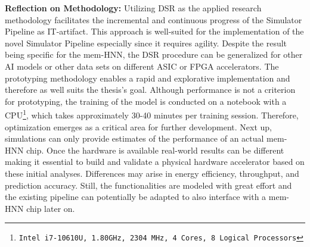 \textbf{Reflection on Methodology:} 
Utilizing \ac{DSR} as the applied research methodology facilitates the incremental and continuous progress of the Simulator Pipeline as \ac{IT}-artifact.
This approach is well-suited for the implementation of the novel Simulator Pipeline especially since it requires agility.
Despite the result being specific for the \ac{mem-HNN}, the \ac{DSR} procedure can be generalized for other AI models or other data sets on different \ac{ASIC} or \ac{FPGA} accelerators. 
The prototyping methodology enables a rapid and explorative implementation and therefore as well suits the thesis's goal. 
Although performance is not a criterion for prototyping, the training of the model is conducted on a notebook with a CPU\footnote{\texttt{Intel i7-10610U, 1.80GHz, 2304 MHz, 4 Cores, 8 Logical Processors}}, which takes approximately 30-40 minutes per training session.
Therefore, optimization emerges as a critical area for further development.
Next up, simulations can only provide estimates of the performance of an actual \ac{mem-HNN} chip.
Once the hardware is available real-world results can be different making it essential to build and validate a physical hardware accelerator based on these initial analyses.
Differences may arise in energy efficiency, throughput, and prediction accuracy.
Still, the functionalities are modeled with great effort and the existing pipeline can potentially be adapted to also interface with a \ac{mem-HNN} chip later on.

